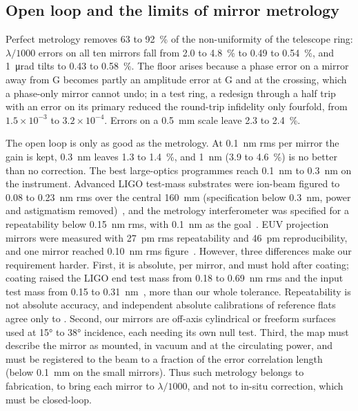 \documentclass[11pt]{article}
\begin{document}
\subsection{Open loop and the limits of mirror metrology}

Perfect metrology removes 63 to \SI{92}{\percent} of the non-uniformity of the telescope ring:
$\lambda/1000$ errors on all ten mirrors fall from 2.0 to \SI{4.8}{\percent} to 0.49 to
\SI{0.54}{\percent}, and \SI{1}{\micro\radian} tilts to 0.43 to \SI{0.58}{\percent}. The floor arises
because a phase error on a mirror away from G becomes partly an amplitude error at G and at the
crossing, which a phase-only mirror cannot undo; in a test ring, a redesign through a half trip with an
error on its primary reduced the round-trip infidelity only fourfold, from $1.5\times10^{-3}$ to
$3.2\times10^{-4}$. Errors on a \SI{0.5}{\milli\metre} scale leave 2.3 to \SI{2.4}{\percent}.

The open loop is only as good as the metrology. At \SI{0.1}{\nano\metre} rms per mirror the gain is
kept, \SI{0.3}{\nano\metre} leaves 1.3 to \SI{1.4}{\percent}, and \SI{1}{\nano\metre} (3.9 to
\SI{4.6}{\percent}) is no better than no correction. The best large-optics programmes reach
\SI{0.1}{\nano\metre} to \SI{0.3}{\nano\metre} on the instrument. Advanced LIGO test-mass substrates were
ion-beam figured to 0.08 to \SI{0.23}{\nano\metre} rms over the central \SI{160}{\milli\metre}
(specification below \SI{0.3}{\nano\metre}, power and astigmatism removed)~\cite{LIGO2015,LIGOE080512},
and the metrology interferometer was specified for a repeatability below \SI{0.15}{\nano\metre} rms,
with \SI{0.1}{\nano\metre} as the goal~\cite{LIGOE080508}. EUV projection mirrors were measured with
\SI{27}{\pico\metre} rms repeatability and \SI{46}{\pico\metre} reproducibility, and one mirror reached
\SI{0.10}{\nano\metre} rms figure~\cite{Kurz2004}. However, three differences make our requirement
harder. First, it is absolute, per mirror, and must hold after coating; coating raised the LIGO end
test mass from 0.18 to \SI{0.69}{\nano\metre} rms and the input test mass from 0.15 to
\SI{0.31}{\nano\metre}~\cite{LIGO2015}, more than our whole tolerance. Repeatability is not absolute
accuracy, and independent absolute calibrations of reference flats agree only to
. Second, our mirrors are off-axis cylindrical or
freeform surfaces used at \ang{15} to \ang{38} incidence, each needing its own null test. Third, the
map must describe the mirror as mounted, in vacuum and at the circulating power, and must be registered
to the beam to a fraction of the error correlation length (below \SI{0.1}{\milli\metre} on the small
mirrors). Thus such metrology belongs to fabrication, to bring each mirror to $\lambda/1000$, and not to
in-situ correction, which must be closed-loop.
\end{document}
